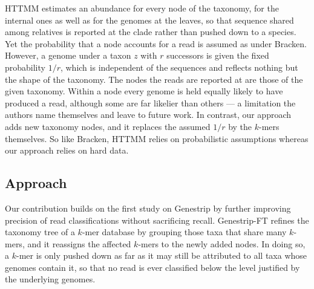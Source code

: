 \documentclass[pdflatex,sn-vancouver-num]{sn-jnl}
\begin{document}
HTTMM \citep{httmm} estimates an abundance for every node of the taxonomy, for the internal ones as well as for the genomes at the leaves, so that sequence shared among relatives is reported at the clade rather than pushed down to a species. Yet the probability that a node accounts for a read is assumed as under Bracken. However, a genome under a taxon $z$ with $r$ successors is given the fixed probability $1/r$, which is independent of the sequences and reflects nothing but the shape of the taxonomy. The nodes the reads are reported at are those of the given taxonomy. Within a node every genome is held equally likely to have produced a read, although some are far likelier than others --- a limitation the authors name themselves and leave to future work. In contrast, our approach adds new taxonomy nodes, and it replaces the assumed $1/r$ by the $k$-mers themselves. So like Bracken, HTTMM relies on probabilistic assumptions whereas our approach relies on hard data.



    \subsection{Approach}
    \label{approach}
    Our contribution builds on the first study on Genestrip \citep{genestrip-pub} by further improving precision of read classifications without sacrificing recall. Genestrip-FT refines the taxonomy tree of a $k$-mer database by grouping those taxa that share many $k$-mers, and it reassigns the affected $k$-mers to the newly added nodes. In doing so, a $k$-mer is only pushed down as far as it may still be attributed to all taxa whose genomes contain it, so that no read is ever classified below the level justified by the underlying genomes.
\end{document}
